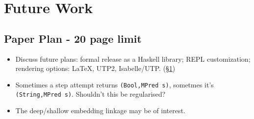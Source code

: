 \section{Future Work}\label{sec:Future}

\subsection*{Paper Plan - 20 page limit}

\begin{itemize}
  \item
    Discuss future plans: formal release as a Haskell library;
    REPL customization; rendering options: \LaTeX, UTP2, Isabelle/UTP\cite{DBLP:conf/utp/FosterZW14}.
    (\S\ref{sec:Future})
  \item
    Sometimes a step attempt returns \texttt{(Bool,MPred s)},
    sometmes it's \texttt{(String,MPred s)}. Shouldn't this be regularised?
  \item
    The deep/shallow embedding linkage\cite{Gibbons:2014:FDS} may be of interest.
\end{itemize}
